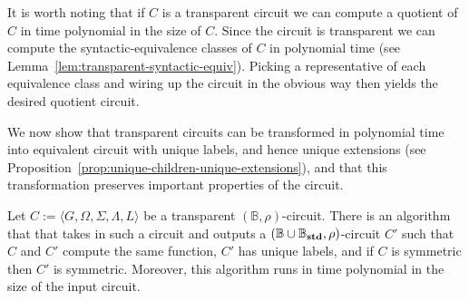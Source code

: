\documentclass[../paper.tex]{subfiles}
\begin{document}
It is worth noting that if $C$ is a transparent circuit we can compute a
quotient of $C$ in time polynomial in the size of $C$. Since the circuit is
transparent we can compute the syntactic-equivalence classes of $C$ in
polynomial time (see Lemma~\ref{lem:transparent-syntactic-equiv}). Picking a
representative of each equivalence class and wiring up the circuit in the
obvious way then yields the desired quotient circuit.

We now show that transparent circuits can be transformed in polynomial time into
equivalent circuit with unique labels, and hence unique extensions (see
Proposition~\ref{prop:unique-children-unique-extensions}), and that this transformation preserves important properties of
the circuit.

\begin{lem}
  Let $C := \langle G, \Omega, \Sigma, \Lambda, L \rangle$ be a transparent
  $(\mathbb{B}, \rho)$-circuit. There is an algorithm that that takes in such a
  circuit and outputs a $(\mathbb{B} \cup \mathbb{B}_{\text{\textbf{std}}}, \rho)$-circuit $C'$
  such that $C$ and $C'$ compute the same function, $C'$ has unique labels, and
  if $C$ is symmetric then $C'$ is symmetric. Moreover, this algorithm runs in
  time polynomial in the size of the input circuit.
  \label{lem:transparent-unique}
\end{lem}
\end{document}
